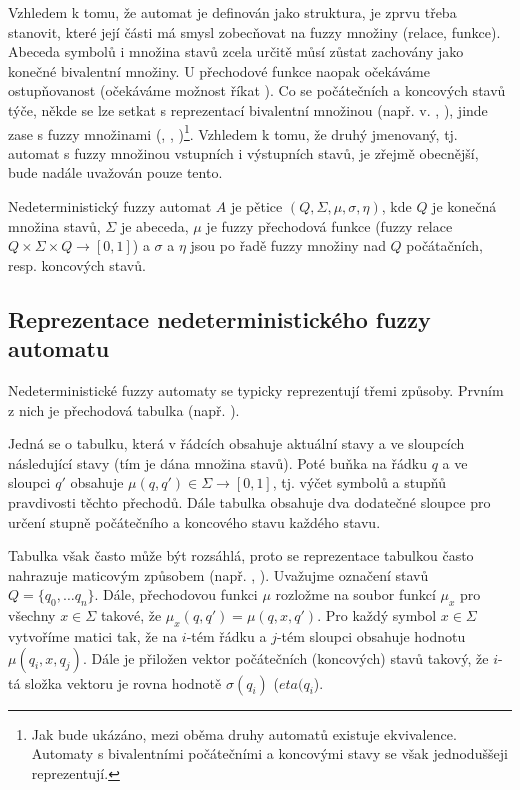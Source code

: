\documentclass[a4paper,10pt]{article}
\begin{document}
Vzhledem k tomu, že automat je definován jako struktura, je zprvu třeba stanovit, které její části má smysl zobecňovat na fuzzy množiny (relace, funkce). Abeceda symbolů i množina stavů zcela určitě můsí zůstat zachovány jako konečné bivalentní množiny. U přechodové funkce naopak očekáváme ostupňovanost (očekáváme možnost říkat ). Co se počátečních a koncových stavů týče, někde se lze setkat s reprezentací bivalentní množinou (např. v. \cite{AndAbdAsm-ApprPattMatcFuzzLog}, \cite{SnaKepAbrHas-AproxStriMatchFuzzAut}), jinde zase s fuzzy množinami (\cite{StaCir-ConsFuzzAutFuzzRegExp}, \cite{AstGariGonVillFar-ApprStrMatUsiDefFuzzAutLearExpr}, \cite{Bel-DetAndFuzzAut} \cite{GonGar-FuzzLangInfRanAccGuzzAutPumLemDetProc})\footnote{Jak bude ukázáno, mezi oběma druhy automatů existuje ekvivalence. Automaty s bivalentními počátečními a koncovými stavy se však jednoduššeji reprezentují.}. Vzhledem k tomu, že druhý jmenovaný, tj. automat s fuzzy množinou vstupních i 
výstupních stavů, je zřejmě obecnější, bude nadále uvažován pouze tento.

\begin{definition}\label{def-ZaklDefNedFuzzAut}
 Nedeterministický fuzzy automat $A$ je pětice $(Q, \Sigma, \mu, \sigma, \eta)$, kde $Q$ je konečná množina stavů, $\Sigma$ je abeceda, $\mu$ je fuzzy přechodová funkce (fuzzy relace $Q \times \Sigma \times Q \rightarrow [0, 1]$) a $\sigma$ a $\eta$ jsou po řadě fuzzy množiny nad $Q$ počátačních, resp. koncových stavů.
\end{definition}

\subsection{Reprezentace nedeterministického fuzzy automatu}
Nedeterministické fuzzy automaty se typicky reprezentují třemi způsoby. Prvním z nich je přechodová tabulka (např. \cite{DooKre-NewDirFuzzAut}). 

Jedná se o tabulku, která v řádcích obsahuje aktuální stavy a ve sloupcích následující stavy (tím je dána množina stavů). Poté buňka na řádku $q$ a ve sloupci $q'$ obsahuje $\mu(q, q') \in \Sigma \rightarrow [0, 1]$, tj. výčet symbolů a stupňů pravdivosti těchto přechodů. Dále tabulka obsahuje dva dodatečné sloupce pro určení stupně počátečního a koncového stavu každého stavu.

Tabulka však často může být rozsáhlá, proto se reprezentace tabulkou často nahrazuje maticovým způsobem (např. \cite{SnaKepAbrHas-AproxStriMatchFuzzAut}, \cite{StaCir-ConsFuzzAutFuzzRegExp}). Uvažujme označení stavů $Q = \{ q_0, \dots q_n \}$. Dále, přechodovou funkci $\mu$ rozložme na soubor funkcí $\mu_x$ pro všechny $x \in \Sigma$ takové, že $\mu_x(q, q') = \mu(q, x, q')$. Pro každý symbol $x \in \Sigma$ vytvoříme matici tak, že na $i$-tém řádku a $j$-tém sloupci obsahuje hodnotu $\mu(q_i, x, q_j)$. Dále je přiložen vektor počátečních (koncových) stavů takový, že $i$-tá složka vektoru je rovna hodnotě $\sigma(q_i)$ ($eta(q_i$).
\end{document}

